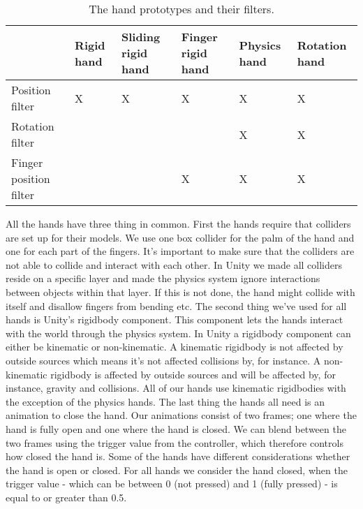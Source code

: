 \begin{table}[H]
\centering
\caption{The hand prototypes and their filters.}
\label{tab:handPrototypes}
\begin{tabular}{C{2.8cm}|C{2cm}C{2cm}C{2cm}C{2cm}C{2cm}}
 & Rigid hand & Sliding rigid hand & Finger rigid hand & Physics hand & Rotation hand \\ \midrule
Position filter & \Large X & \Large X & \Large X & \Large X & \Large X\\ \midrule
Rotation filter & & & & \Large X & \Large X \\ \midrule
Finger position filter & & & \Large X & \Large X & \Large X 
\end{tabular}
\end{table}

All the hands have three thing in common. First the hands require that colliders are set up for their models. We use one box collider for the palm of the hand and one for each part of the fingers. It's important to make sure that the colliders are not able to collide and interact with each other. In Unity we made all colliders reside on a specific layer and made the physics system ignore interactions between objects within that layer. If this is not done, the hand might collide with itself and disallow fingers from bending etc. The second thing we've used for all hands is Unity's rigidbody component. This component lets the hands interact with the world through the physics system. In Unity a rigidbody component can either be kinematic or non-kinematic. A kinematic rigidbody is not affected by outside sources which means it's not affected collisions by, for instance. A non-kinematic rigidbody is affected by outside sources and will be affected by, for instance, gravity and collisions. All of our hands use kinematic rigidbodies with the exception of the physics hands. The last thing the hands all need is an animation to close the hand. Our animations consist of two frames; one where the hand is fully open and one where the hand is closed. We can blend between the two frames using the trigger value from the controller, which therefore controls how closed the hand is. Some of the hands have different considerations whether the hand is open or closed. For all hands we consider the hand closed, when the trigger value - which can be between 0 (not pressed) and 1 (fully pressed) - is equal to or greater than 0.5.


